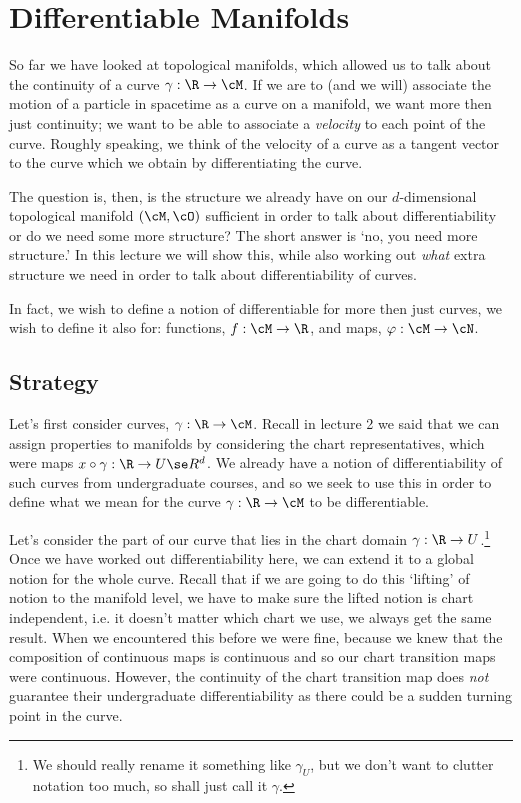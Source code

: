 \chapter{Differentiable Manifolds}

So far we have looked at topological manifolds, which allowed us to talk about the continuity of a curve $\gamma:\R\to\cM$. If we are to (and we will) associate the motion of a particle in spacetime as a curve on a manifold, we want more then just continuity; we want to be able to associate a \textit{velocity} to each point of the curve. Roughly speaking, we think of the velocity of a curve as a tangent vector to the curve which we obtain by differentiating the curve. 

The question is, then, is the structure we already have on our $d$-dimensional topological manifold $(\cM,\cO)$ sufficient in order to talk about differentiability  or do we need some more structure? The short answer is `no, you need more structure.' In this lecture we will show this, while also working out \textit{what} extra structure we need in order to talk about differentiability of curves.

In fact, we wish to define a notion of differentiable for more then just curves, we wish to define it also for: functions, $f:\cM\to\R$, and maps, $\varphi:\cM\to\cN$.

\section{Strategy}

Let's first consider curves, $\gamma:\R\to\cM$. Recall in lecture 2 we said that we can assign properties to manifolds by considering the chart representatives, which were maps $x\circ\gamma: \R\to U\se R^d$. We already have a notion of differentiability of such curves from undergraduate courses, and so we seek to use this in order to define what we mean for the curve $\gamma:\R\to\cM$ to be differentiable. 

Let's consider the part of our curve that lies in the chart domain $\gamma: \R \to U$.\footnote{We should really rename it something like $\gamma_U$, but we don't want to clutter notation too much, so shall just call it $\gamma$.} Once we have worked out differentiability here, we can extend it to a global notion for the whole curve. Recall that if we are going to do this `lifting' of notion to the manifold level, we have to make sure the lifted notion is chart independent, i.e. it doesn't matter which chart we use, we always get the same result. When we encountered this before we were fine, because we knew that the composition of continuous maps is continuous and so our chart transition maps were continuous. However, the continuity of the chart transition map does \textit{not} guarantee their undergraduate differentiability as there could be a sudden turning point in the curve. 

